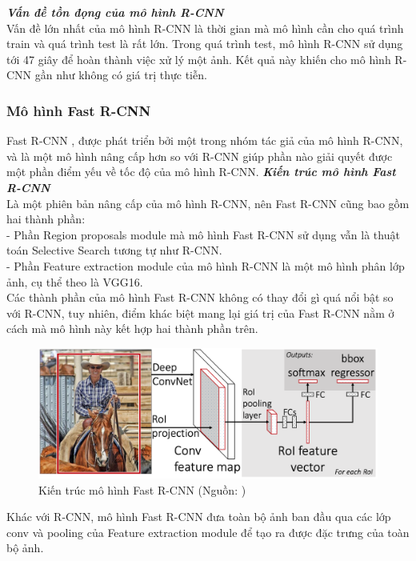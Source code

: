 {        \noindent
        \textbf{\textit{Vấn đề tồn đọng của mô hình R-CNN}} \\
        Vấn đề lớn nhất của mô hình R-CNN là thời gian mà mô hình cần cho quá trình train và quá trình test là rất lớn.
        Trong quá trình test, mô hình R-CNN sử dụng tới 47 giây để hoàn thành việc xử lý một ảnh.
        Kết quả này khiến cho mô hình R-CNN gần như không có giá trị thực tiễn.

    \subsubsection{Mô hình Fast R-CNN}
        Fast R-CNN \cite{girshick2015fast}, được phát triển bởi một trong nhóm tác giả của mô hình R-CNN, và là một mô hình nâng cấp hơn so với R-CNN giúp phần nào giải quyết được một phần điểm yếu về tốc độ của mô hình R-CNN.
        \noindent
        \textbf{\textit{Kiến trúc mô hình Fast R-CNN}} \\
        Là một phiên bản nâng cấp của mô hình R-CNN, nên Fast R-CNN cũng bao gồm hai thành phần: \\
        - Phần Region proposals module mà mô hình Fast R-CNN sử dụng vẫn là thuật toán Selective Search tương tự như R-CNN. \\
        - Phần Feature extraction module của mô hình R-CNN là một mô hình phân lớp ảnh, cụ thể theo \cite{girshick2015fast} là VGG16. \\
        Các thành phần của mô hình Fast R-CNN không có thay đổi gì quá nổi bật so với R-CNN, tuy nhiên, điểm khác biệt mang lại giá trị của Fast R-CNN nằm ở cách mà mô hình này kết hợp hai thành phần trên.
        \begin{figure}[H]
            \centering
            \includegraphics[width=13cm] {images/fast_rcnn_model}
            \caption{Kiến trúc mô hình Fast R-CNN (Nguồn: \cite{girshick2015fast})}
            \label{fig:fast_rcnn_model}
        \end{figure}
        \noindent
        Khác với R-CNN, mô hình Fast R-CNN đưa toàn bộ ảnh ban đầu qua các lớp conv và pooling của Feature extraction module để tạo ra được đặc trưng của toàn bộ ảnh.
}
